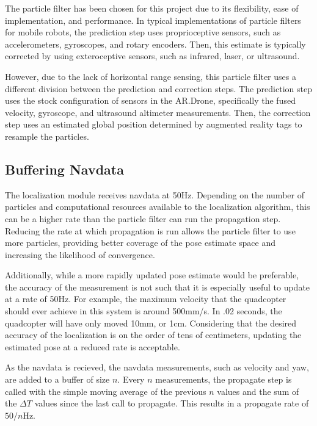 	The particle filter has been chosen for this project due to its flexibility, ease of implementation, and performance. In typical implementations of particle filters for mobile robots, the prediction step uses proprioceptive sensors, such as accelerometers, gyroscopes, and rotary encoders. Then, this estimate is typically corrected by using exteroceptive sensors, such as infrared, laser, or ultrasound.

	However, due to the lack of horizontal range sensing, this particle filter uses a different division between the prediction and correction steps. The prediction step uses the stock configuration of sensors in the AR.Drone, specifically the fused velocity, gyroscope, and ultrasound altimeter measurements. Then, the correction step uses an estimated global position determined by augmented reality tags to resample the particles.


	\subsection{Buffering Navdata}

		The localization module receives navdata at 50Hz. Depending on the number of particles and computational resources available to the localization algorithm, this can be a higher rate than the particle filter can run the propagation step. Reducing the rate at which propagation is run allows the particle filter to use more particles, providing better coverage of the pose estimate space and increasing the likelihood of convergence.

		Additionally, while a more rapidly updated pose estimate would be preferable, the accuracy of the measurement is not such that it is especially useful to update at a rate of 50Hz. For example, the maximum velocity that the quadcopter should ever achieve in this system is around 500mm/s. In .02 seconds, the quadcopter will have only moved 10mm, or 1cm. Considering that the desired accuracy of the localization is on the order of tens of centimeters, updating the estimated pose at a reduced rate is acceptable.

		As the navdata is recieved, the navdata measurements, such as velocity and yaw, are added to a buffer of size $n$. Every $n$ measurements, the propagate step is called with the simple moving average of the previous $n$ values and the sum of the $\Delta T$ values since the last call to propagate. This results in a propagate rate of $50/n$Hz.

